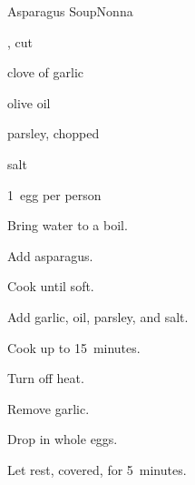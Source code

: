 \begin{recipe}{Asparagus Soup}{Nonna}{}

\begin{ingredients}
\item {}, cut
\item clove of garlic
\item olive oil
\item parsley, chopped
\item salt
\item 1~egg per person
\end{ingredients}

\begin{directions}
\item Bring water to a boil.
\item Add asparagus.
\item Cook until soft.
\item Add garlic, oil, parsley, and salt.
\item Cook up to 15~minutes.
\item Turn off heat.
\item Remove garlic.
\item Drop in whole eggs.
\item Let rest, covered, for 5~minutes.
\end{directions}

\end{recipe}
